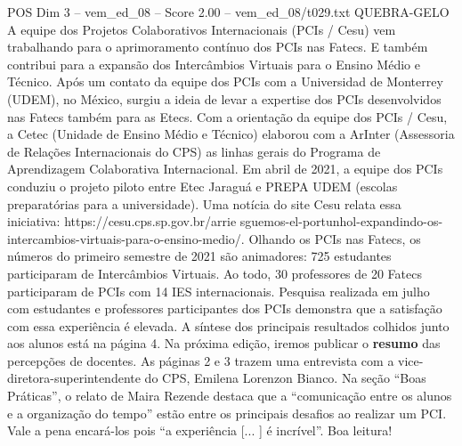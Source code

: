\begin{textsample}{POS Dim 3 – vem\_ed\_08 – Score 2.00 – vem\_ed\_08/t029.txt}  \label{ex:f3_pos_173}
QUEBRA-GELO A equipe dos Projetos Colaborativos Internacionais (PCIs / Cesu) vem trabalhando para o aprimoramento contínuo dos PCIs nas Fatecs.
E também contribui para a expansão dos Intercâmbios Virtuais para o Ensino Médio e Técnico.
Após um contato da equipe dos PCIs com a Universidad de Monterrey (UDEM), no México, surgiu a ideia de levar a expertise dos PCIs desenvolvidos nas Fatecs também para as Etecs.
Com a orientação da equipe dos PCIs / Cesu, a Cetec (Unidade de Ensino Médio e Técnico) elaborou com a ArInter (Assessoria de Relações Internacionais do CPS) as linhas gerais do Programa de Aprendizagem Colaborativa Internacional.
Em abril de 2021, a equipe dos PCIs conduziu o projeto piloto entre Etec Jaraguá e PREPA UDEM (escolas preparatórias para a universidade).
Uma notícia do site Cesu relata essa iniciativa: https://cesu.cps.sp.gov.br/arrie sguemos-el-portunhol-expandindo-os-intercambios-virtuais-para-o-ensino-medio/.
Olhando os PCIs nas Fatecs, os números do primeiro semestre de 2021 são animadores: 725 estudantes participaram de Intercâmbios Virtuais.
Ao todo, 30 professores de 20 Fatecs participaram de PCIs com 14 IES internacionais.
Pesquisa realizada em julho com estudantes e professores participantes dos PCIs demonstra que a satisfação com essa experiência é elevada.
A síntese dos principais resultados colhidos junto aos alunos está na página 4.
Na próxima edição, iremos publicar o \textbf{resumo} das percepções de docentes.
As páginas 2 e 3 trazem uma entrevista com a vice-diretora-superintendente do CPS, Emilena Lorenzon Bianco.
Na seção “Boas Práticas”, o relato de Maira Rezende destaca que a “comunicação entre os alunos e a organização do tempo” estão entre os principais desafios ao realizar um PCI.
Vale a pena encará-los pois “a experiência [... ] é incrível”.
Boa leitura!

\end{textsample}
